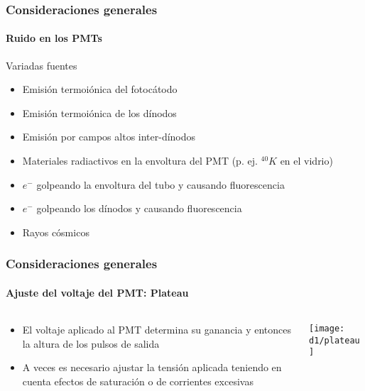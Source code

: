 \documentclass{beamer}
\begin{document}
\begin{frame}
\frametitle{Consideraciones generales}
\framesubtitle{Ruido en los PMTs}
\begin{block}{Variadas fuentes}
\begin{itemize}
\item Emisi\'on termoi\'onica del fotoc\'atodo
\item Emisi\'on termoi\'onica de los d\'inodos
\item Emisi\'on por campos altos inter-d\'inodos
\item Materiales radiactivos en la envoltura del PMT (p. ej. $^{40}K$ en el
vidrio) 
\item $e^-$ golpeando la envoltura del tubo y causando fluorescencia 
\item $e^-$ golpeando los d\'inodos y causando fluorescencia 
\item Rayos c\'osmicos
\end{itemize}
\end{block}
\end{frame}

\begin{frame}
\frametitle{Consideraciones generales}
\framesubtitle{Ajuste del voltaje del PMT: Plateau}
\begin{columns}
\begin{column}{0.5\textwidth}
\begin{itemize}
\item El voltaje aplicado al PMT determina su ganancia y entonces la altura de
los pulsos de salida
\item A veces es necesario ajustar la tensi\'on aplicada teniendo en cuenta
efectos de saturaci\'on o de corrientes excesivas
\end{itemize}
\end{column}
\begin{column}{0.5\textwidth}
\begin{center}
\texttt{[image: d1/plateau]}
\end{center}
\end{column}
\end{columns}
\end{frame}
\end{document}
